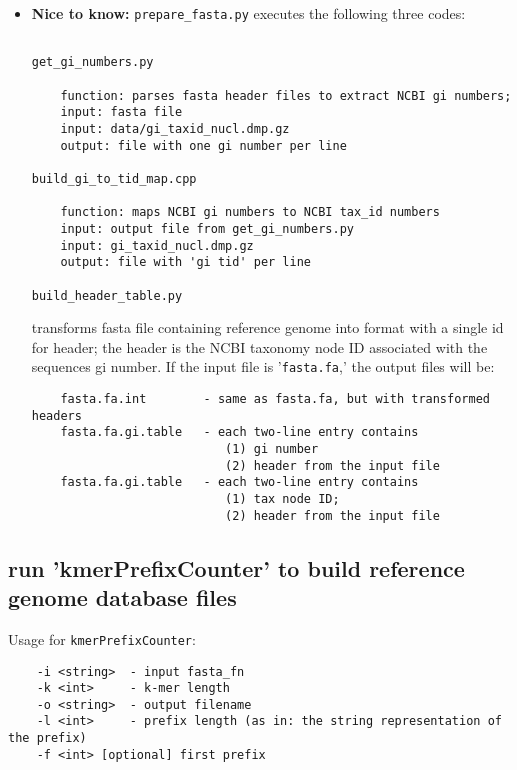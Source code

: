 \documentclass[11pt]{article}
\begin{document}
\begin{itemize}
\item
\textbf{Nice to know:} \texttt{prepare\_fasta.py} executes the following three codes:

\begin{verbatim}

get_gi_numbers.py

    function: parses fasta header files to extract NCBI gi numbers;
    input: fasta file
    input: data/gi_taxid_nucl.dmp.gz
    output: file with one gi number per line

build_gi_to_tid_map.cpp

    function: maps NCBI gi numbers to NCBI tax_id numbers
    input: output file from get_gi_numbers.py
    input: gi_taxid_nucl.dmp.gz
    output: file with 'gi tid' per line

build_header_table.py

\end{verbatim}

  transforms fasta file containing reference genome into format with a
  single id for header; the header is the NCBI taxonomy node ID associated
  with the sequences gi number. If the input file is '\texttt{fasta.fa},'
  the output files will be:

\begin{verbatim}
    fasta.fa.int        - same as fasta.fa, but with transformed headers
    fasta.fa.gi.table   - each two-line entry contains
                           (1) gi number
                           (2) header from the input file
    fasta.fa.gi.table   - each two-line entry contains
                           (1) tax node ID;
                           (2) header from the input file

\end{verbatim}
\end{itemize}

\subsection{run 'kmerPrefixCounter' to build reference genome database files}

   Usage for \texttt{kmerPrefixCounter}:
   \begin{verbatim}
    -i <string>  - input fasta_fn
    -k <int>     - k-mer length
    -o <string>  - output filename
    -l <int>     - prefix length (as in: the string representation of the prefix)
    -f <int> [optional] first prefix
\end{verbatim}
\end{document}
